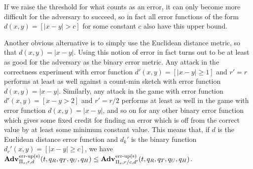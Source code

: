 


If we raise the threshold for what counts as an error, it can only become more difficult for the adversary to succeed, so in fact all error functions of the form $d(x,y) = [|x - y| > c]$ for some constant $c$ also have this upper bound.

Another obvious alternative is to simply use the Euclidean distance metric, so that $d(x,y) = |x - y|$. Using this notion of error in fact turns out to be at least as good for the adversary as the binary error metric. Any attack in the correctness experiment with error function $d'(x,y) = [|x - y| \ge 1]$ and $r' = r$ performs at least as well against a count-min sketch with error function $d(x,y) = |x - y|$. Similarly, any attack in the game with error function $d'(x,y) = [x - y > 2]$ and $r' = r/2$ performs at least as well in the game with error function $d(x,y) = |x - y|$, and so on for any other binary error function which gives some fixed credit for finding an error which is off from the correct value by at least some minimum constant value. This means that, if $d$ is the Euclidean distance error function and $d_k'$ is the binary function $d_c'(x,y) = [|x - y| \ge c]$, we have $\Adv{\erreps}_{\struct_s,r,d}(t, q_R, q_T, q_U, q_H) \le \Adv{\erreps}_{\struct_s,r/c,d'}(t, q_R, q_T, q_U, q_H)$.

